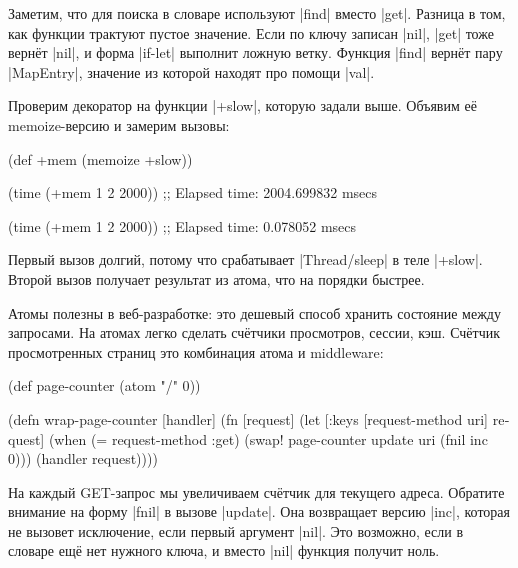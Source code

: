 
Заметим, что для поиска в словаре используют \spverb|find| вместо
\spverb|get|. Разница в том, как функции трактуют пустое значение. Если по ключу
записан \spverb|nil|, \spverb|get| тоже верн\"{е}т \spverb|nil|, и форма
\spverb|if-let| выполнит ложную ветку. Функция \spverb|find| верн\"{е}т пару
\spverb|MapEntry|, значение из которой находят про помощи \spverb|val|.

Проверим декоратор на функции \spverb|+slow|, которую задали выше. Объявим е\"{е}
memoize-версию и замерим вызовы:

\begin{english}
  \begin{clojure}
(def +mem (memoize +slow))

(time (+mem 1 2 2000))
;; Elapsed time: 2004.699832 msecs

(time (+mem 1 2 2000))
;; Elapsed time: 0.078052 msecs
  \end{clojure}
\end{english}


Первый вызов долгий, потому что срабатывает \spverb|Thread/sleep| в теле
\spverb|+slow|. Второй вызов получает результат из атома, что на порядки
быстрее.


Атомы полезны в веб-разработке: это дешевый способ хранить состояние между
запросами. На атомах легко сделать сч\"{е}тчики просмотров, сессии, кэш. Сч\"{е}тчик
просмотренных страниц это комбинация атома и middleware:

\begin{english}
  \begin{clojure}
(def page-counter
  (atom {"/" 0}))

(defn wrap-page-counter
  [handler]
  (fn [request]
    (let [{:keys [request-method uri]} request]
      (when (= request-method :get)
        (swap! page-counter update uri (fnil inc 0)))
      (handler request))))
  \end{clojure}
\end{english}


На каждый GET-запрос мы увеличиваем сч\"{е}тчик для текущего адреса. Обратите
внимание на форму \spverb|fnil| в вызове \spverb|update|. Она возвращает версию
\spverb|inc|, которая не вызовет исключение, если первый аргумент
\spverb|nil|. Это возможно, если в словаре ещ\"{е} нет нужного ключа, и вместо
\spverb|nil| функция получит ноль.

